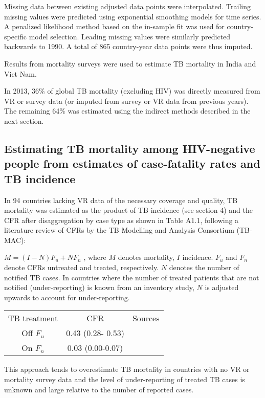 Missing data between existing adjusted data points were interpolated. Trailing missing values were predicted using exponential smoothing models for time series. A penalized likelihood method based on the in-sample fit was used for country-specific model selection. Leading missing values were similarly predicted backwards to 1990. A total of 865 country-year data points were thus imputed.

Results from mortality surveys were used to estimate TB mortality in India and Viet Nam. 

In 2013, 36\% of global TB mortality (excluding HIV) was directly measured from VR or survey data (or imputed from survey or VR data from previous years). The remaining 64\% was estimated using the indirect methods described in the next section.


\subsection{Estimating TB mortality among HIV-negative people from estimates of case-fatality rates and TB incidence
}

In 94 countries lacking VR data of the necessary coverage and quality, TB mortality was estimated as the product of TB incidence (see section 4) and the CFR after disaggregation by case type as shown in Table A1.1, following a literature review of CFRs by the TB Modelling and Analysis Consortium (TB-MAC):

$M = (I-N)F_u + NF_n$ , where $M$ denotes mortality, $I$ incidence. $F_u$ and $F_n$ denote CFRs untreated and treated, respectively. $N$ denotes the number of notified TB cases. In countries where the number of treated patients that are not notified (under-reporting) is known from an inventory study, $N$ is adjusted upwards to account for under-reporting. 

\begin{table} 
    \begin{tabular}{ c c c }
        TB treatment & CFR & Sources \\ 
        Off $F_u$ & 0.43 (0.28- 0.53) &  \cite{12742798} \cite{21483732} \\ 
        On $F_n$ & 0.03 (0.00-0.07) &  \cite{21738585} \\ 
    \end{tabular} 
\end{table}

This approach tends to overestimate TB mortality in countries with no VR or mortality survey data and the level of under-reporting of treated TB cases is unknown and large relative to the number of reported cases. 


